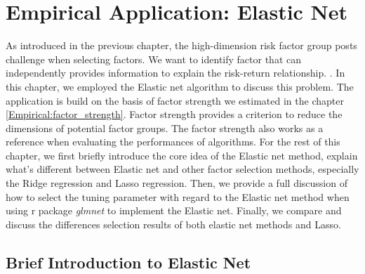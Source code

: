 \chapter{Empirical Application: Elastic Net}\label{Empirical:Elastic_net}
As introduced in the previous chapter, the high-dimension risk factor group posts challenge when selecting factors.
We want to identify factor that can independently provides information to explain the risk-return relationship. \cite{Cochrane2011}.
In this chapter, we employed the Elastic net algorithm to discuss this problem.
The application is build on the basis of factor strength we estimated in the chapter \ref{Empirical:factor_strength}.
Factor strength provides a criterion to reduce the dimensions of potential factor groups.
The factor strength also works as a reference when evaluating the performances of algorithms.
For the rest of this chapter, we first briefly introduce the core idea of the Elastic net method, explain what's different between Elastic net and other factor selection methods, especially the Ridge regression and Lasso regression.
Then, we provide a full discussion of how to select the tuning parameter with regard to the Elastic net method when using r package \textit{glmnet} to implement the Elastic net.
Finally, we compare and discuss the differences selection results of both elastic net methods and Lasso.


\section{Brief Introduction to Elastic Net} \label{Elastic_Net}

